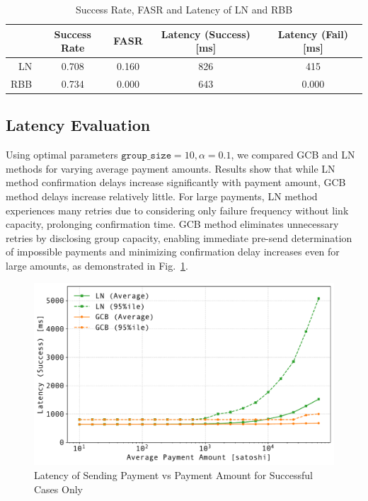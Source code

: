 \documentclass[conference]{IEEEtran}
\newcommand{\groupsize}{\texttt{group\_size}}
\begin{document}
\begin{table}[htbp]
	\caption{Success Rate, FASR and Latency of LN and RBB}
	\centering
	\label{tab:result_group_and_ideal}
	\begin{tabular}{r|cccc}
		    & Success Rate & FASR  & Latency (Success) [ms] & Latency (Fail) [ms] \\
		\hline
		LN  & 0.708        & 0.160 & 826                    & 415                 \\
		RBB & 0.734        & 0.000 & 643                    & 0.000               \\
	\end{tabular}
\end{table}

\subsection{Latency Evaluation}

Using optimal parameters $\groupsize=10, \alpha=0.1$, we compared GCB and LN methods for varying average payment amounts. Results show that while LN method confirmation delays increase significantly with payment amount, GCB method delays increase relatively little. For large payments, LN method experiences many retries due to considering only failure frequency without link capacity, prolonging confirmation time. GCB method eliminates unnecessary retries by disclosing group capacity, enabling immediate pre-send determination of impossible payments and minimizing confirmation delay increases even for large amounts, as demonstrated in Fig.~\ref{fig:pmt_amt_vs_time}.

\begin{figure}[htbp]
	\centerline{\includegraphics[width=\linewidth]{fig/pmt_amt_vs_time}}
	\caption{Latency of Sending Payment vs Payment Amount for Successful Cases Only}
	\label{fig:pmt_amt_vs_time}
\end{figure}
\end{document}
